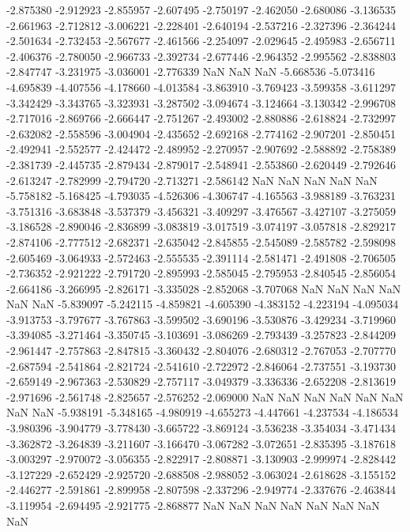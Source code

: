 -2.875380
-2.912923
-2.855957
-2.607495
-2.750197
-2.462050
-2.680086
-3.136535
-2.661963
-2.712812
-3.006221
-2.228401
-2.640194
-2.537216
-2.327396
-2.364244
-2.501634
-2.732453
-2.567677
-2.461566
-2.254097
-2.029645
-2.495983
-2.656711
-2.406376
-2.780050
-2.966733
-2.392734
-2.677446
-2.964352
-2.995562
-2.838803
-2.847747
-3.231975
-3.036001
-2.776339
NaN
NaN
NaN
-5.668536
-5.073416
-4.695839
-4.407556
-4.178660
-4.013584
-3.863910
-3.769423
-3.599358
-3.611297
-3.342429
-3.343765
-3.323931
-3.287502
-3.094674
-3.124664
-3.130342
-2.996708
-2.717016
-2.869766
-2.666447
-2.751267
-2.493002
-2.880886
-2.618824
-2.732997
-2.632082
-2.558596
-3.004904
-2.435652
-2.692168
-2.774162
-2.907201
-2.850451
-2.492941
-2.552577
-2.424472
-2.489952
-2.270957
-2.907692
-2.588892
-2.758389
-2.381739
-2.445735
-2.879434
-2.879017
-2.548941
-2.553860
-2.620449
-2.792646
-2.613247
-2.782999
-2.794720
-2.713271
-2.586142
NaN
NaN
NaN
NaN
NaN
-5.758182
-5.168425
-4.793035
-4.526306
-4.306747
-4.165563
-3.988189
-3.763231
-3.751316
-3.683848
-3.537379
-3.456321
-3.409297
-3.476567
-3.427107
-3.275059
-3.186528
-2.890046
-2.836899
-3.083819
-3.017519
-3.074197
-3.057818
-2.829217
-2.874106
-2.777512
-2.682371
-2.635042
-2.845855
-2.545089
-2.585782
-2.598098
-2.605469
-3.064933
-2.572463
-2.555535
-2.391114
-2.581471
-2.491808
-2.706505
-2.736352
-2.921222
-2.791720
-2.895993
-2.585045
-2.795953
-2.840545
-2.856054
-2.664186
-3.266995
-2.826171
-3.335028
-2.852068
-3.707068
NaN
NaN
NaN
NaN
NaN
NaN
-5.839097
-5.242115
-4.859821
-4.605390
-4.383152
-4.223194
-4.095034
-3.913753
-3.797677
-3.767863
-3.599502
-3.690196
-3.530876
-3.429234
-3.719960
-3.394085
-3.271464
-3.350745
-3.103691
-3.086269
-2.793439
-3.257823
-2.844209
-2.961447
-2.757863
-2.847815
-3.360432
-2.804076
-2.680312
-2.767053
-2.707770
-2.687594
-2.541864
-2.821724
-2.541610
-2.722972
-2.846064
-2.737551
-3.193730
-2.659149
-2.967363
-2.530829
-2.757117
-3.049379
-3.336336
-2.652208
-2.813619
-2.971696
-2.561748
-2.825657
-2.576252
-2.069000
NaN
NaN
NaN
NaN
NaN
NaN
NaN
NaN
-5.938191
-5.348165
-4.980919
-4.655273
-4.447661
-4.237534
-4.186534
-3.980396
-3.904779
-3.778430
-3.665722
-3.869124
-3.536238
-3.354034
-3.471434
-3.362872
-3.264839
-3.211607
-3.166470
-3.067282
-3.072651
-2.835395
-3.187618
-3.003297
-2.970072
-3.056355
-2.822917
-2.808871
-3.130903
-2.999974
-2.828442
-3.127229
-2.652429
-2.925720
-2.688508
-2.988052
-3.063024
-2.618628
-3.155152
-2.446277
-2.591861
-2.899958
-2.807598
-2.337296
-2.949774
-2.337676
-2.463844
-3.119954
-2.694495
-2.921775
-2.868877
NaN
NaN
NaN
NaN
NaN
NaN
NaN
NaN
